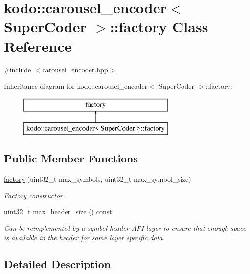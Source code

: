 \hypertarget{classkodo_1_1carousel__encoder_1_1factory}{\section{kodo\-:\-:carousel\-\_\-encoder$<$ Super\-Coder $>$\-:\-:factory Class Reference}
\label{classkodo_1_1carousel__encoder_1_1factory}
}


{\ttfamily \#include $<$carousel\-\_\-encoder.\-hpp$>$}

Inheritance diagram for kodo\-:\-:carousel\-\_\-encoder$<$ Super\-Coder $>$\-:\-:factory\-:\begin{figure}[H]
\begin{center}
\leavevmode
\includegraphics[height=2.000000cm]{classkodo_1_1carousel__encoder_1_1factory}
\end{center}
\end{figure}
\subsection*{Public Member Functions}
\begin{DoxyCompactItemize}
\item 
\hyperlink{classkodo_1_1carousel__encoder_1_1factory_afb768911ab480c9dcdf4d39033bebc4c}{factory} (uint32\-\_\-t max\-\_\-symbols, uint32\-\_\-t max\-\_\-symbol\-\_\-size)
\begin{DoxyCompactList}\small\item\em Factory constructor. \end{DoxyCompactList}\item 
uint32\-\_\-t \hyperlink{classkodo_1_1carousel__encoder_1_1factory_aa1ce16f711fdf20b9af45f8bb3553eb9}{max\-\_\-header\-\_\-size} () const 
\begin{DoxyCompactList}\small\item\em Can be reimplemented by a symbol header A\-P\-I layer to ensure that enough space is available in the header for some layer specific data. \end{DoxyCompactList}\end{DoxyCompactItemize}


\subsection{Detailed Description}
